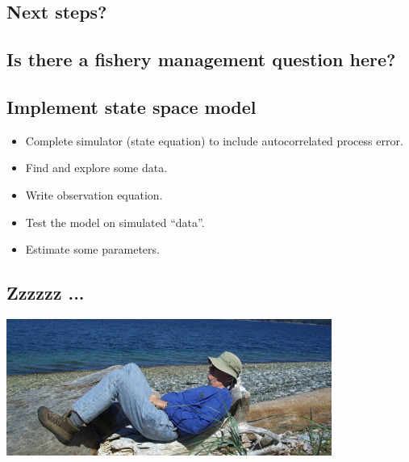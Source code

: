 \documentclass[a4paper,KOMA,landscape,titlepage]{powersem}
\begin{document}
\begin{slide}\section{Next steps?}
\subsection{Is there a fishery management question here?}
\subsection{Implement state space model}
\begin{itemize}
\item Complete simulator (state equation) to include autocorrelated process error. 
\item Find and explore some data.
\item Write observation equation.
\item Test the model on simulated ``data''.
\item Estimate some parameters.
\end{itemize}
\end{slide}


\begin{slide}\section{Zzzzzz ... }
\begin{center}
\includegraphics[width=0.8\textwidth]{./graphics/recumbant.png}
\end{center}
\end{slide}
\end{document}
